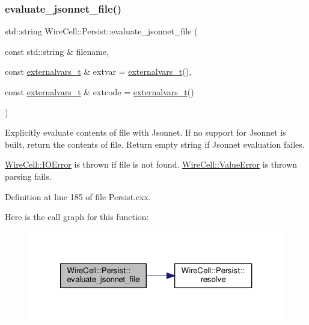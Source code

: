 \subsubsection{\texorpdfstring{evaluate\+\_\+jsonnet\+\_\+file()}{evaluate\_jsonnet\_file()}}
{\footnotesize\ttfamily std\+::string Wire\+Cell\+::\+Persist\+::evaluate\+\_\+jsonnet\+\_\+file (\begin{DoxyParamCaption}\item[{const std\+::string \&}]{filename,  }\item[{const \hyperlink{namespace_wire_cell_1_1_persist_ae031fc57de5b5814ccd700d007bc847b}{externalvars\+\_\+t} \&}]{extvar = {\ttfamily \hyperlink{namespace_wire_cell_1_1_persist_ae031fc57de5b5814ccd700d007bc847b}{externalvars\+\_\+t}()},  }\item[{const \hyperlink{namespace_wire_cell_1_1_persist_ae031fc57de5b5814ccd700d007bc847b}{externalvars\+\_\+t} \&}]{extcode = {\ttfamily \hyperlink{namespace_wire_cell_1_1_persist_ae031fc57de5b5814ccd700d007bc847b}{externalvars\+\_\+t}()} }\end{DoxyParamCaption})}

Explicitly evaluate contents of file with Jsonnet. If no support for Jsonnet is built, return the contents of file. Return empty string if Jsonnet evaluation failes.

\hyperlink{class_wire_cell_1_1_i_o_error}{Wire\+Cell\+::\+I\+O\+Error} is thrown if file is not found. \hyperlink{struct_wire_cell_1_1_value_error}{Wire\+Cell\+::\+Value\+Error} is thrown parsing fails. 

Definition at line 185 of file Persist.\+cxx.

Here is the call graph for this function\+:
\nopagebreak
\begin{figure}[H]
\begin{center}
\leavevmode
\includegraphics[width=321pt]{namespace_wire_cell_1_1_persist_ab70e06414625bf66f10b20dd41112697_cgraph}
\end{center}
\end{figure}
\mbox{\label{namespace_wire_cell_1_1_persist_ab593a212dbed0b2185fe5fe70b29fc68}} 

